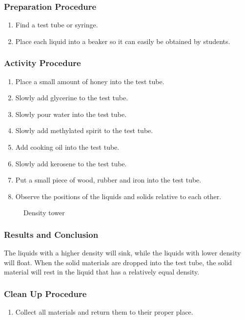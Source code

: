 \subsubsection*{Preparation Procedure}
\begin{enumerate}
\item{Find a test tube or syringe.}
\item{Place each liquid into a beaker so it can easily be obtained by students.} 
\end{enumerate}

\subsubsection*{Activity Procedure}
\begin{enumerate}
\item{Place a small amount of honey into the test tube.} 
\item{Slowly add glycerine to the test tube.} 
\item{Slowly pour water into the test tube.} 
\item{Slowly add methylated spirit to the test tube.} 
\item{Add cooking oil into the test tube.} 
\item{Slowly add kerosene to the test tube.} 
\item{Put a small piece of wood, rubber and iron into the test tube.}
\item{Observe the positions of the liquids and solids relative to each other.}

\end{enumerate}
\begin{figure}[h]
\begin{center}
\def\svgwidth{200pt}

\caption{Density tower}
\label{fig:density-tower}
\end{center}
\end{figure}

\subsubsection*{Results and Conclusion}
The liquids with a higher density will sink, while the liquids with lower density will float. When the solid materials are dropped into the test tube, the solid material will rest in the liquid that has a relatively equal density.  

\subsubsection*{Clean Up Procedure}
\begin{enumerate}
\item{Collect all materials and return them to their proper place.} 
\end{enumerate}

